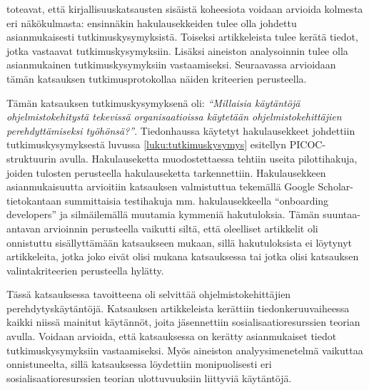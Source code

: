 \documentclass[utf8]{gradu3}
\begin{document}
\textcite{kitchenham-charters-2007} toteavat, että kirjallisuuskatsausten sisäistä koheesiota voidaan arvioida kolmesta eri näkökulmasta: ensinnäkin hakulausekkeiden tulee olla johdettu asianmukaisesti tutkimuskysymyksistä. Toiseksi artikkeleista tulee kerätä tiedot, jotka vastaavat tutkimuskysymyksiin. Lisäksi aineiston analysoinnin tulee olla asianmukainen tutkimuskysymyksiin vastaamiseksi. Seuraavassa arvioidaan tämän katsauksen tutkimusprotokollaa näiden kriteerien perusteella.

Tämän katsauksen tutkimuskysymyksenä oli: \textit{“Millaisia käytäntöjä ohjelmistokehitystä tekevissä organisaatioissa käytetään ohjelmistokehittäjien perehdyttämiseksi työhönsä?”}. Tiedonhaussa käytetyt hakulausekkeet johdettiin tutkimuskysymyksestä luvussa \ref{luku:tutkimuskysymys} esitellyn PICOC-struktuurin avulla. Hakulauseketta muodostettaessa tehtiin useita pilottihakuja, joiden tulosten perusteella hakulauseketta tarkennettiin. Hakulausekkeen asianmukaisuutta arvioitiin katsauksen valmistuttua tekemällä Google Scholar-tietokantaan summittaisia testihakuja mm. hakulausekkeella “onboarding developers” ja silmäilemällä muutamia kymmeniä hakutuloksia. Tämän suuntaa-antavan arvioinnin perusteella vaikutti siltä, että oleelliset artikkelit oli onnistuttu sisällyttämään katsaukseen mukaan, sillä hakutuloksista ei löytynyt artikkeleita, jotka joko eivät olisi mukana katsauksessa tai jotka olisi katsauksen valintakriteerien perusteella hylätty. 

Tässä katsauksessa tavoitteena oli selvittää ohjelmistokehittäjien perehdytyskäytäntöjä. Katsauksen artikkeleista kerättiin tiedonkeruuvaiheessa kaikki niissä mainitut käytännöt, joita jäsennettiin sosialisaatioresurssien teorian avulla. Voidaan arvioida, että katsauksessa on kerätty asianmukaiset tiedot tutkimuskysymyksiin vastaamiseksi. Myös aineiston analyysimenetelmä vaikuttaa onnistuneelta, sillä katsauksessa löydettiin monipuolisesti eri sosialisaatioresurssien teorian ulottuvuuksiin liittyviä käytäntöjä.
\end{document}
